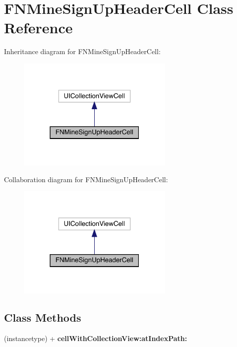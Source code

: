 \hypertarget{interface_f_n_mine_sign_up_header_cell}{}\section{F\+N\+Mine\+Sign\+Up\+Header\+Cell Class Reference}
\label{interface_f_n_mine_sign_up_header_cell}


Inheritance diagram for F\+N\+Mine\+Sign\+Up\+Header\+Cell\+:\nopagebreak
\begin{figure}[H]
\begin{center}
\leavevmode
\includegraphics[width=214pt]{interface_f_n_mine_sign_up_header_cell__inherit__graph}
\end{center}
\end{figure}


Collaboration diagram for F\+N\+Mine\+Sign\+Up\+Header\+Cell\+:\nopagebreak
\begin{figure}[H]
\begin{center}
\leavevmode
\includegraphics[width=214pt]{interface_f_n_mine_sign_up_header_cell__coll__graph}
\end{center}
\end{figure}
\subsection*{Class Methods}
\begin{DoxyCompactItemize}
\item 
\mbox{\label{interface_f_n_mine_sign_up_header_cell_a8794ccbfd67fe36c317e550ed606f33d}} 
(instancetype) + {\bfseries cell\+With\+Collection\+View\+:at\+Index\+Path\+:}
\end{DoxyCompactItemize}
